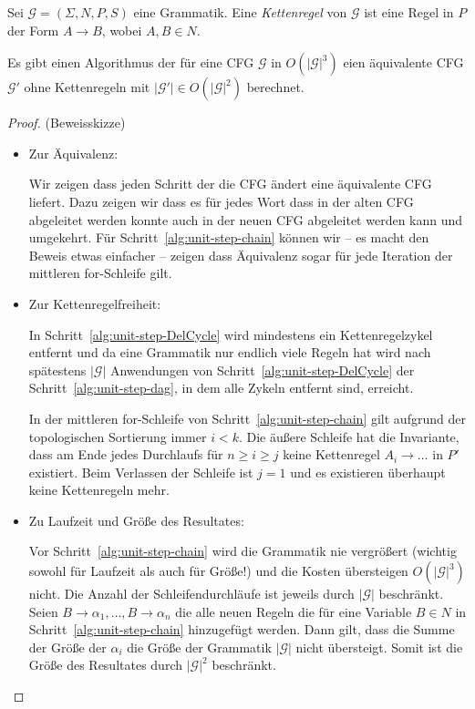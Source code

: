 \begin{Def}
  Sei $\mathcal{G} = (\Sigma, N, P, S)$ eine Grammatik.
  Eine \emph{Kettenregel} von $\mathcal{G}$ ist eine Regel in $P$ der Form $A \to B$, wobei $A,B \in N$.
\end{Def}

\begin{lemma}
Es gibt einen Algorithmus der für eine \ac{CFG} $\mathcal{G}$ in $O(|\mathcal{G}|^3)$ eien äquivalente \ac{CFG} $\mathcal{G}'$ ohne Kettenregeln mit $|\mathcal{G}'|\in O(|\mathcal{G}|^2)$ berechnet.
\end{lemma}
\begin{proof} (Beweisskizze)
	\begin{itemize}
	\item Zur Äquivalenz:
	
	Wir zeigen dass jeden Schritt der die \ac{CFG} ändert eine äquivalente \ac{CFG} liefert.
	Dazu zeigen wir dass es für jedes Wort dass in der alten \ac{CFG} abgeleitet werden konnte auch in der neuen \ac{CFG} abgeleitet werden kann und umgekehrt.
	Für Schritt~\ref{alg:unit-step-chain} können wir -- es macht den Beweis etwas einfacher -- zeigen dass Äquivalenz sogar für jede Iteration der mittleren for-Schleife gilt.
	
	\item Zur Kettenregelfreiheit:
	
	In Schritt~\ref{alg:unit-step-DelCycle} wird mindestens ein Kettenregelzykel entfernt und da eine Grammatik nur endlich viele Regeln hat wird nach spätestens $|\mathcal{G}|$ Anwendungen von Schritt~\ref{alg:unit-step-DelCycle} der Schritt~\ref{alg:unit-step-dag}, in dem alle Zykeln entfernt sind, erreicht.
	
	In der mittleren for-Schleife von Schritt~\ref{alg:unit-step-chain} gilt aufgrund der topologischen Sortierung immer $i<k$.
	Die äußere Schleife hat die Invariante, dass am Ende jedes Durchlaufs für $n \ge i \ge j$ keine Kettenregel $A_i \to \ldots$ in $P'$ existiert.
	Beim Verlassen der Schleife ist $j = 1$ und es existieren überhaupt keine Kettenregeln mehr.
	
	\item Zu Laufzeit und Größe des Resultates:
	
		Vor Schritt~\ref{alg:unit-step-chain} wird die Grammatik nie vergrößert (wichtig sowohl für Laufzeit als auch für Größe!) und die Kosten übersteigen $O(|\mathcal{G}|^3)$ nicht.
		Die Anzahl der Schleifendurchläufe ist jeweils durch $|\mathcal{G}|$ beschränkt.
		Seien $B \to \alpha_1, \ldots, B \to \alpha_n$ die alle neuen Regeln die für eine Variable $B\in N$ in Schritt~\ref{alg:unit-step-chain} hinzugefügt werden.
		Dann gilt, dass die Summe der Größe der $\alpha_i$ die Größe der Grammatik $|\mathcal{G}|$ nicht übersteigt. 
		Somit ist die Größe des Resultates durch $|\mathcal{G}|^2$ beschränkt.
		\qedhere
	\end{itemize}
\end{proof}

